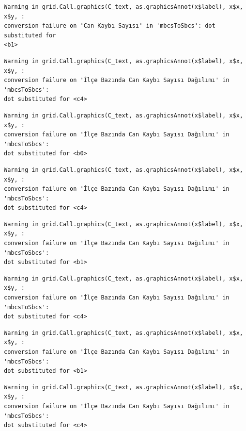 \documentclass[
  11pt,
  a4paper,
  DIV=11,
  numbers=noendperiod]{scrartcl}
\begin{document}
\begin{verbatim}
Warning in grid.Call.graphics(C_text, as.graphicsAnnot(x$label), x$x, x$y, :
conversion failure on 'Can Kaybı Sayısı' in 'mbcsToSbcs': dot substituted for
<b1>
\end{verbatim}

\begin{verbatim}
Warning in grid.Call.graphics(C_text, as.graphicsAnnot(x$label), x$x, x$y, :
conversion failure on 'İlçe Bazında Can Kaybı Sayısı Dağılımı' in 'mbcsToSbcs':
dot substituted for <c4>
\end{verbatim}

\begin{verbatim}
Warning in grid.Call.graphics(C_text, as.graphicsAnnot(x$label), x$x, x$y, :
conversion failure on 'İlçe Bazında Can Kaybı Sayısı Dağılımı' in 'mbcsToSbcs':
dot substituted for <b0>
\end{verbatim}

\begin{verbatim}
Warning in grid.Call.graphics(C_text, as.graphicsAnnot(x$label), x$x, x$y, :
conversion failure on 'İlçe Bazında Can Kaybı Sayısı Dağılımı' in 'mbcsToSbcs':
dot substituted for <c4>
\end{verbatim}

\begin{verbatim}
Warning in grid.Call.graphics(C_text, as.graphicsAnnot(x$label), x$x, x$y, :
conversion failure on 'İlçe Bazında Can Kaybı Sayısı Dağılımı' in 'mbcsToSbcs':
dot substituted for <b1>
\end{verbatim}

\begin{verbatim}
Warning in grid.Call.graphics(C_text, as.graphicsAnnot(x$label), x$x, x$y, :
conversion failure on 'İlçe Bazında Can Kaybı Sayısı Dağılımı' in 'mbcsToSbcs':
dot substituted for <c4>
\end{verbatim}

\begin{verbatim}
Warning in grid.Call.graphics(C_text, as.graphicsAnnot(x$label), x$x, x$y, :
conversion failure on 'İlçe Bazında Can Kaybı Sayısı Dağılımı' in 'mbcsToSbcs':
dot substituted for <b1>
\end{verbatim}

\begin{verbatim}
Warning in grid.Call.graphics(C_text, as.graphicsAnnot(x$label), x$x, x$y, :
conversion failure on 'İlçe Bazında Can Kaybı Sayısı Dağılımı' in 'mbcsToSbcs':
dot substituted for <c4>
\end{verbatim}
\end{document}
